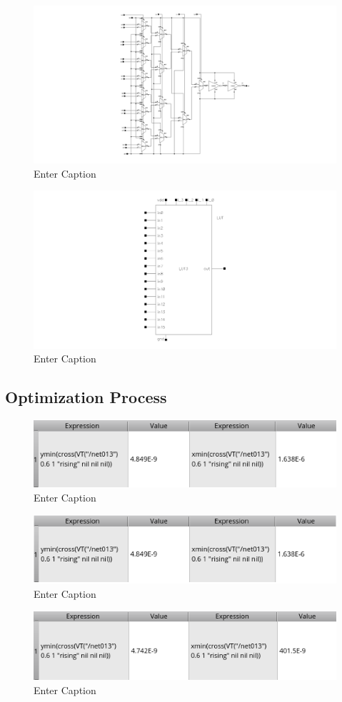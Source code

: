 \documentclass[12pt]{article}
\begin{document}
\begin{figure}[H]
    \centering
    \includegraphics[width=0.5\linewidth]{writeup//figures/updated_delay_opt_LUTschem.png}
    \caption{Enter Caption}
\end{figure}

\begin{figure}[H]
    \centering
    \includegraphics[width=0.5\linewidth]{writeup//figures/updated_delay_opt_LUTsym.png}
    \caption{Enter Caption}
\end{figure}


\newpage

\subsection{Optimization Process}

\begin{figure}[H]
    \centering
    \includegraphics[width=0.5\linewidth]{writeup//figures/optimized_wmux_value.png}
    \caption{Enter Caption}
\end{figure}

\begin{figure}[H]
    \centering
    \includegraphics[width=0.5\linewidth]{writeup//figures/wmux1.png}
    \caption{Enter Caption}
\end{figure}

\begin{figure}[H]
    \centering
    \includegraphics[width=0.5\linewidth]{writeup//figures/optimized_wbuf_value.png}
    \caption{Enter Caption}
\end{figure}
\end{document}
